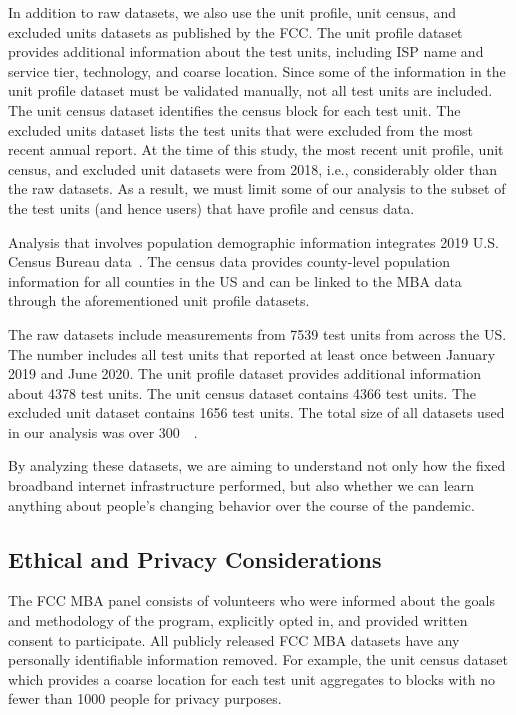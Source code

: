 \documentclass[conference,10pt]{IEEEtran}
\begin{document}
In addition to raw datasets, we also use the unit profile, unit census, and excluded units datasets as published by the \gls{FCC}. The unit profile dataset provides additional information about the test units, including \gls{ISP} name and service tier, technology, and coarse location. Since some of the information in the unit profile dataset must be validated manually, not all test units are included. The unit census dataset identifies the census block for each test unit. The excluded units dataset lists the test units that were excluded from the most recent annual report. At the time of this study, the most recent unit profile, unit census, and excluded unit datasets were from 2018, i.e., considerably older than the raw datasets. As a result, we must limit some of our analysis to the subset of the test units (and hence users) that have profile and census data.

Analysis that involves population demographic information integrates 2019 U.S. Census Bureau data~\cite{census}. The census data provides county-level population information for all counties in the \gls{US} and can be linked to the \gls{MBA} data through the aforementioned unit profile datasets.

The raw datasets include measurements from 7539 test units from across the \gls{US}. The number includes all test units that reported at least once between January 2019 and June 2020. The unit profile dataset provides additional information about 4378 test units. The unit census dataset contains 4366 test units. The excluded unit dataset contains 1656 test units. The total size of all datasets used in our analysis was over \SI{300}{\giga\byte}.

By analyzing these datasets, we are aiming to understand not only how the fixed broadband internet infrastructure performed, but also whether we can learn anything about people's changing behavior over the course of the pandemic.

\subsection{Ethical and Privacy Considerations}\label{sec:ethical-and-privacy-considerations}

The \gls{FCC} \gls{MBA} panel consists of volunteers who were informed about the goals and methodology of the program, explicitly opted in, and provided written consent to participate. All publicly released \gls{FCC} \gls{MBA} datasets have any personally identifiable information removed. For example, the unit census dataset which provides a coarse location for each test unit aggregates to blocks with no fewer than 1000 people for privacy purposes.
\end{document}
